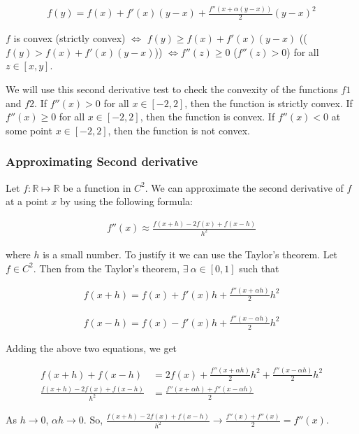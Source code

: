 \documentclass{article}
\begin{document}
\begin{align*}
    f(y) = f(x) + f'(x)(y - x) + \frac{f''(x + \alpha(y - x))}{2}(y - x)^2
\end{align*}

$f$ is convex (strictly convex) $\iff$ $f(y) \geq f(x) + f'(x)(y - x)$ (($f(y) > f(x) + f'(x) (y - x)$)) $\iff f''(z) \geq 0$ ($f''(z) > 0$) for all $z \in [x, y]$.

We will use this second derivative test to check the convexity of the functions $f1$ and $f2$. If $f''(x) > 0$ for all $x \in [-2, 2]$, then the function is strictly convex. If $f''(x) \geq 0$ for all $x \in [-2, 2]$, then the function is convex. If $f''(x) < 0$ at some point $x \in [-2, 2]$, then the function is not convex.

\subsubsection*{Approximating Second derivative}

Let $f: \mathbb{R} \mapsto \mathbb{R}$ be a function in $C^2$. We can approximate the second derivative of $f$ at a point $x$ by using the following formula:

\begin{align*}
    f''(x) \approx \frac{f(x + h) - 2f(x) + f(x - h)}{h^2}
\end{align*}

where $h$ is a small number. To justify it we can use the Taylor's theorem. Let $f \in C^2$. Then from the Taylor's theorem, $\exists\ \alpha \in [0, 1]$ such that

\begin{align*}
    f(x + h) = f(x) + f'(x)h + \frac{f''(x + \alpha h)}{2}h^2
\end{align*}

\begin{align*}
    f(x - h) = f(x) - f'(x)h + \frac{f''(x - \alpha h)}{2}h^2
\end{align*}

Adding the above two equations, we get

\begin{align*}
    f(x + h) + f(x - h) &= 2f(x) + \frac{f''(x + \alpha h)}{2}h^2 + \frac{f''(x - \alpha h)}{2}h^2 \\
    \frac{f(x + h) - 2f(x) + f(x - h)}{h^2} &= \frac{f''(x + \alpha h) + f''(x - \alpha h)}{2}
\end{align*}

As $h \to 0$, $\alpha h \to 0$. So, $\frac{f(x + h) - 2f(x) + f(x - h)}{h^2} \to \frac{f''(x) + f''(x)}{2} = f''(x)$.
\end{document}
